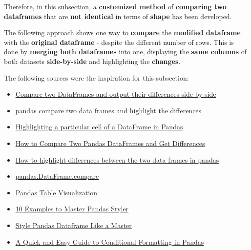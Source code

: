 \documentclass [oneside,10pt,a4paper,ngerman,BCOR10mm,headsepline,parindent,final]{scrartcl}
\providecommand{\tightlist}{%
      \setlength{\itemsep}{0pt}\setlength{\parskip}{0pt}}
\begin{document}
    Therefore, in this subsection, a \textbf{customized method} of
\textbf{comparing two dataframes} that are \textbf{not identical} in
terms of \textbf{shape} has been developed.

The following approach shows one way to \textbf{compare} the
\textbf{modified dataframe} with the \textbf{original dataframe} -
despite the different number of rows. This is done by \textbf{merging
both dataframes} into one, displaying the \textbf{same columns} of both
datasets \textbf{side-by-side} and highlighting the \textbf{changes}.

The following sources were the inspiration for this subsection:

\begin{itemize}
\tightlist
\item
  \href{https://stackoverflow.com/questions/17095101/compare-two-dataframes-and-output-their-differences-side-by-side/47112033\#47112033}{Compare
  two DataFrames and output their differences side-by-side}
\item
  \href{https://stackoverflow.com/questions/71604701/pandas-compare-two-data-frames-and-highlight-the-differences/71617662\#71617662}{pandas
  compare two data frames and highlight the differences}
\item
  \href{https://www.skytowner.com/explore/highlighting_a_particular_cell_of_a_dataframe_in_pandas}{Highlighting
  a particular cell of a DataFrame in Pandas}
\item
  \href{https://datascientyst.com/compare-two-pandas-dataframes-get-differences/}{How
  to Compare Two Pandas DataFrames and Get Differences}
\item
  \href{https://stackoverflow.com/questions/70566100/how-to-highlight-differences-between-the-two-data-frames-in-pandas}{How
  to highlight differences between the two data frames in pandas}
\item
  \href{https://pandas.pydata.org/docs/dev/reference/api/pandas.DataFrame.compare.html}{pandas.DataFrame.compare}
\item
  \href{https://pandas.pydata.org/pandas-docs/stable/user_guide/style.html}{Pandas
  Table Visualization}
\item
  \href{https://towardsdatascience.com/10-examples-to-master-pandas-styler-408ea794e91}{10
  Examples to Master Pandas Styler}
\item
  \href{https://towardsdatascience.com/style-pandas-dataframe-like-a-master-6b02bf6468b0}{Style
  Pandas Dataframe Like a Master}
\item
  \href{https://towardsdatascience.com/a-quick-and-easy-guide-to-conditional-formatting-in-pandas-8783035071ee}{A
  Quick and Easy Guide to Conditional Formatting in Pandas}
\end{itemize}
\end{document}
